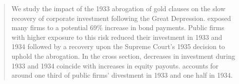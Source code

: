 \begin{titlepage}
\vspace*{-1cm}
\begin{abstract}
\small 
\onehalfspacing
\noindent 
We study the impact of the 1933 abrogation of gold clauses on the slow recovery of corporate investment following the Great Depression.  exposed many firms to a potential 69\% increase in bond payments. Public firms with higher exposure to this risk reduced their investment in 1933 and 1934 followed by a recovery upon the Supreme Court's 1935 decision to uphold the abrogation. In the cross section, decreases in investment during 1933 and 1934 coincide with increases in equity payouts.  accounts for around one third of public firms' divestment in 1933 and one half in 1934.
\end{abstract}
\end{titlepage}

\hypersetup{pageanchor=true}
\clearpage

\setcounter{page}{1}